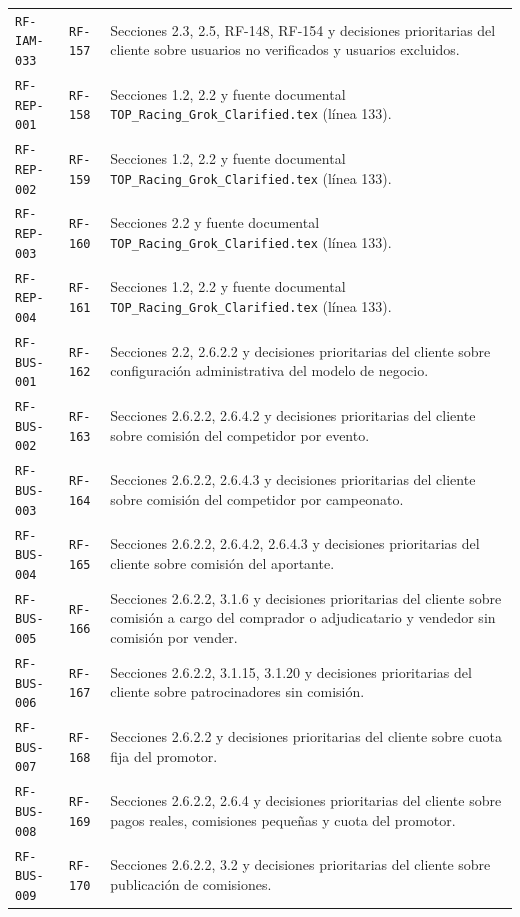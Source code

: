 \documentclass[10pt,letterpaper]{article}
\begin{document}
\begin{landscape}
\begin{longtable}{P{2.7cm}P{2.6cm}P{15.7cm}}
\texttt{RF-IAM-033} & \texttt{RF-157} & Secciones 2.3, 2.5, RF-148, RF-154 y decisiones prioritarias del cliente sobre usuarios no verificados y usuarios excluidos.\\
\texttt{RF-REP-001} & \texttt{RF-158} & Secciones 1.2, 2.2 y fuente documental \texttt{TOP\_Racing\_Grok\_Clarified.tex} (línea 133).\\
\texttt{RF-REP-002} & \texttt{RF-159} & Secciones 1.2, 2.2 y fuente documental \texttt{TOP\_Racing\_Grok\_Clarified.tex} (línea 133).\\
\texttt{RF-REP-003} & \texttt{RF-160} & Secciones 2.2 y fuente documental \texttt{TOP\_Racing\_Grok\_Clarified.tex} (línea 133).\\
\texttt{RF-REP-004} & \texttt{RF-161} & Secciones 1.2, 2.2 y fuente documental \texttt{TOP\_Racing\_Grok\_Clarified.tex} (línea 133).\\
\texttt{RF-BUS-001} & \texttt{RF-162} & Secciones 2.2, 2.6.2.2 y decisiones prioritarias del cliente sobre configuración administrativa del modelo de negocio.\\
\texttt{RF-BUS-002} & \texttt{RF-163} & Secciones 2.6.2.2, 2.6.4.2 y decisiones prioritarias del cliente sobre comisión del competidor por evento.\\
\texttt{RF-BUS-003} & \texttt{RF-164} & Secciones 2.6.2.2, 2.6.4.3 y decisiones prioritarias del cliente sobre comisión del competidor por campeonato.\\
\texttt{RF-BUS-004} & \texttt{RF-165} & Secciones 2.6.2.2, 2.6.4.2, 2.6.4.3 y decisiones prioritarias del cliente sobre comisión del aportante.\\
\texttt{RF-BUS-005} & \texttt{RF-166} & Secciones 2.6.2.2, 3.1.6 y decisiones prioritarias del cliente sobre comisión a cargo del comprador o adjudicatario y vendedor sin comisión por vender.\\
\texttt{RF-BUS-006} & \texttt{RF-167} & Secciones 2.6.2.2, 3.1.15, 3.1.20 y decisiones prioritarias del cliente sobre patrocinadores sin comisión.\\
\texttt{RF-BUS-007} & \texttt{RF-168} & Secciones 2.6.2.2 y decisiones prioritarias del cliente sobre cuota fija del promotor.\\
\texttt{RF-BUS-008} & \texttt{RF-169} & Secciones 2.6.2.2, 2.6.4 y decisiones prioritarias del cliente sobre pagos reales, comisiones pequeñas y cuota del promotor.\\
\texttt{RF-BUS-009} & \texttt{RF-170} & Secciones 2.6.2.2, 3.2 y decisiones prioritarias del cliente sobre publicación de comisiones.\\

\end{longtable}
\end{landscape}
\end{document}
